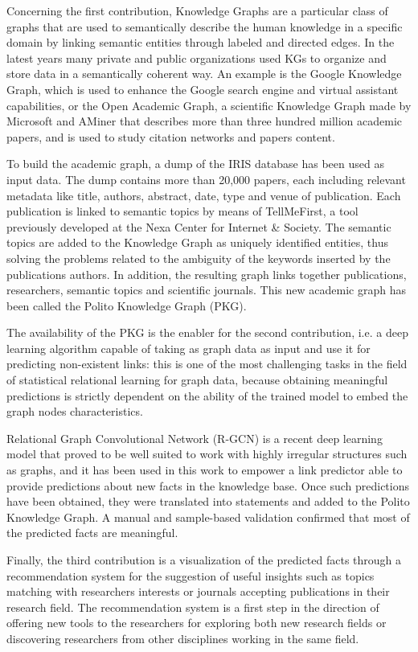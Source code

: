 \documentclass[english, 12pt]{article}
\begin{document}
Concerning the first contribution, Knowledge Graphs are a particular class of
graphs that are used to semantically describe the human knowledge in a specific
domain by linking semantic entities through labeled and directed edges.
In the latest years many private and public organizations used KGs to organize
and store data in a semantically coherent way. An example is the Google
Knowledge Graph, which is used to enhance the Google search engine and virtual
assistant capabilities, or the Open Academic Graph, a scientific Knowledge
Graph made by Microsoft and AMiner that describes more than three hundred
million academic papers, and is used to study citation networks and
papers content.

To build the academic graph, a dump of the IRIS database has been used as
input data.
The dump contains more than 20,000 papers, each including relevant metadata
like title, authors, abstract, date, type and venue of publication. Each
publication is linked to semantic topics by means of TellMeFirst, a tool
previously developed at the Nexa Center for Internet \& Society.
The semantic topics are added to the Knowledge Graph as uniquely identified
entities, thus solving the problems related to the ambiguity of the keywords
inserted by the publications authors. In addition, the resulting graph links
together publications, researchers, semantic topics and scientific journals.
This new academic graph has been called the Polito Knowledge Graph (PKG).

The availability of the PKG is the enabler for the second contribution, i.e. a
deep learning algorithm capable of taking as graph data as input and use it for
predicting non-existent links: this is one of the most challenging tasks in the
field of statistical relational learning for graph data, because obtaining
meaningful predictions is strictly dependent on the ability of the trained
model to embed the graph nodes characteristics.

Relational Graph Convolutional Network (R-GCN) is a recent deep learning
model that proved to be well suited to work with highly irregular structures
such as graphs, and it has been used in this work to empower a link predictor
able to provide predictions about new facts in the knowledge base.
Once such predictions have been obtained, they
were translated into statements and added to the Polito Knowledge Graph.
A manual and sample-based validation confirmed that most of the predicted
facts are meaningful.

Finally, the third contribution is a visualization of the predicted facts
through a recommendation system for the suggestion of useful insights such
as topics matching with researchers interests or journals accepting publications
in their research field. The recommendation system is a first step in the
direction of offering new tools to the researchers for exploring both new
research fields or discovering researchers from other disciplines working
in the same field.
\end{document}
